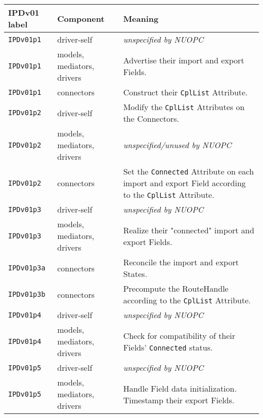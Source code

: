 \vspace*{3ex}
\begin{longtable}[h]{|p{35mm}|p{4cm}|p{6cm}|}
     \hline\hline
     {\bf IPDv01 label} & {\bf Component} & {\bf Meaning}\\
     \hline\hline
     {\tt IPDv01p1} & driver-self                 & {\em unspecified by NUOPC}\\ \hline
     {\tt IPDv01p1} & models, mediators, drivers  & Advertise their import and export Fields.\\ \hline
     {\tt IPDv01p1} & connectors                  & Construct their {\tt CplList} Attribute.\\ \hline
     {\tt IPDv01p2} & driver-self                 & Modify the {\tt CplList} Attributes on the Connectors.\\ \hline
     {\tt IPDv01p2} & models, mediators, drivers  & {\em unspecified/unused by NUOPC}\\ \hline
     {\tt IPDv01p2} & connectors                  & Set the {\tt Connected} Attribute on each import and export Field according to the {\tt CplList} Attribute.\\ \hline
     {\tt IPDv01p3} & driver-self                 & {\em unspecified by NUOPC}\\ \hline
     {\tt IPDv01p3} & models, mediators, drivers  & Realize their "connected" import and export Fields.\\ \hline
     {\tt IPDv01p3a}& connectors                  & Reconcile the import and export States.\\ \hline
     {\tt IPDv01p3b}& connectors                  & Precompute the RouteHandle according to the {\tt CplList} Attribute.\\ \hline
     {\tt IPDv01p4} & driver-self                 & {\em unspecified by NUOPC}\\ \hline
     {\tt IPDv01p4} & models, mediators, drivers  & Check for compatibility of their Fields' {\tt Connected} status.\\ \hline
     {\tt IPDv01p5} & driver-self                 & {\em unspecified by NUOPC}\\ \hline
     {\tt IPDv01p5} & models, mediators, drivers  & Handle Field data initialization. Timestamp their export Fields.\\
     \hline\hline
\end{longtable}

